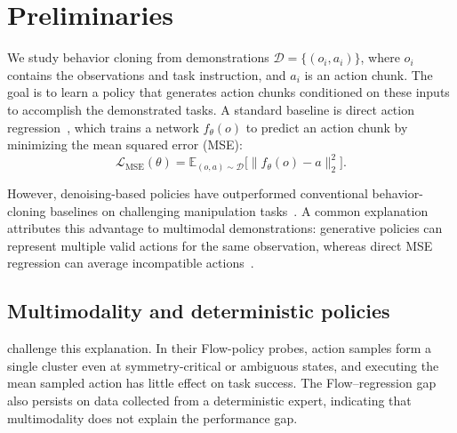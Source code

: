 
\section{Preliminaries}
\label{sec:preliminaries}

We study behavior cloning from demonstrations $\mathcal{D}=\{(o_i,a_i)\}$,
where $o_i$ contains the observations and task instruction, and $a_i$ is an
action chunk. The goal is to learn a policy that generates action chunks
conditioned on these inputs to accomplish the demonstrated tasks.
A standard baseline is direct action regression~\citep{robomimic2021}, which
trains a network $f_\theta(o)$ to predict an action chunk by minimizing the
mean squared error (MSE):
\begin{equation}
    \mathcal{L}_{\mathrm{MSE}}(\theta)
    = \mathbb{E}_{(o,a)\sim\mathcal{D}}
      \bigl[\lVert f_\theta(o)-a\rVert_2^2\bigr].
    \label{eq:prelim-mse}
\end{equation}

However, denoising-based policies have outperformed conventional
behavior-cloning baselines on challenging manipulation
tasks~\citep{chi2023diffusionpolicy,pan2026much}.
A common explanation attributes this advantage to multimodal demonstrations:
generative policies can represent multiple valid actions for the same
observation, whereas direct MSE regression can average incompatible
actions~\citep{chi2023diffusionpolicy}.

\subsection{Multimodality and deterministic policies}
\label{sec:prelim-regression-gap}

\citet{pan2026much} challenge this explanation. In their Flow-policy probes,
action samples form a single cluster even at symmetry-critical or ambiguous
states, and executing the mean sampled action has little effect on task
success. The Flow--regression gap also persists on data collected from a
deterministic expert, indicating that multimodality does not explain
the performance gap.

